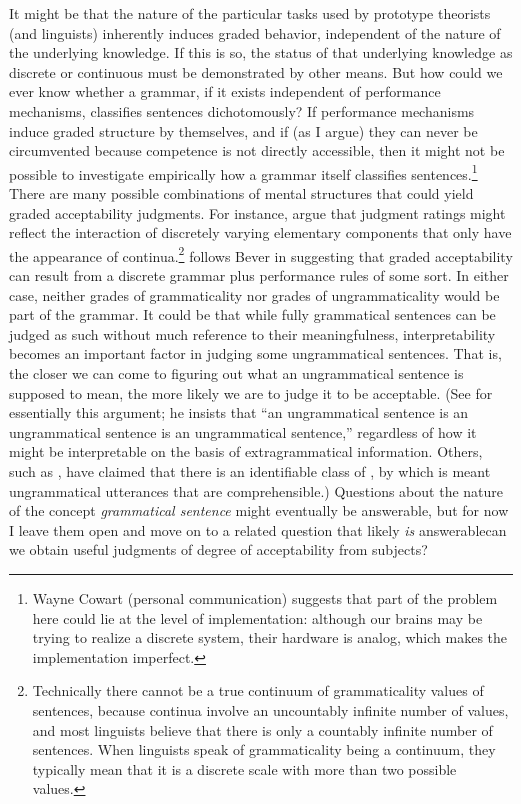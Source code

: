 It might be that the nature of the particular tasks used by prototype theorists (and linguists) inherently induces graded behavior, independent of the nature of the underlying knowledge. If this is so, the status of that underlying knowledge as discrete or continuous must be demonstrated by other means. But how could we ever know whether a grammar, if it exists independent of performance mechanisms, classifies sentences dichotomously? If performance mechanisms induce graded structure by themselves, and if (as I argue) they can never be circumvented because competence is not directly accessible, then it might not be possible to investigate empirically how a grammar itself classifies sentences.\footnote{Wayne Cowart (personal communication) suggests that part of the problem here could lie at the level of implementation: although our brains may be trying to realize a discrete system, their hardware is analog, which makes the implementation imperfect.
}
 There are many possible combinations of mental structures that could yield graded acceptability judgments. For instance,  \citet{FillmoreEtAl1979b} 
 argue that judgment ratings might reflect the interaction of discretely varying elementary components that only have the appearance of continua.\footnote{Technically there cannot be a true continuum of grammaticality values of sentences, because continua involve an uncountably infinite number of values, and most linguists believe that there is only a countably infinite number of sentences. When linguists speak of grammaticality being a continuum, they typically mean that it is a discrete scale with more than two possible values.}
 \citet{Carroll1979} follows Bever in suggesting that graded acceptability can result from a discrete 
grammar plus performance rules of some sort. In either case, neither grades of grammaticality nor grades of ungrammaticality would be part of the grammar. It could be that while fully grammatical sentences can be judged as such without much reference to their meaningfulness, interpretability becomes an important factor in judging some ungrammatical sentences. That is, the closer we can come to figuring out what an ungrammatical sentence is supposed to mean, the more likely we are to judge it to be acceptable. (See \citet{Fowler1970} for essentially this argument; he insists that ``an ungrammatical sentence is an ungrammatical sentence is an ungrammatical sentence,'' regardless of how it might be interpretable on the basis of extragrammatical information. Others, such as \citet{Katz1964}, have claimed that there is an identifiable class of , by which is meant ungrammatical utterances that are comprehensible.) Questions about the nature of the concept \textit{grammatical sentence} might eventually be answerable, but for now I leave them open and move on to a related question that likely \textit{is} answerable\schdash{}can we obtain useful judgments of degree of acceptability from subjects?

